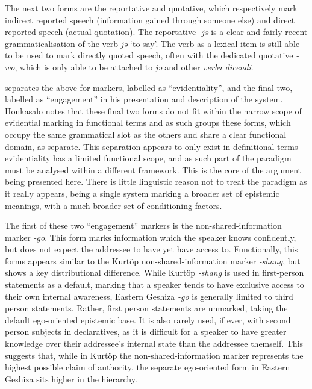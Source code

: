 The next two forms are the reportative and quotative, which respectively mark indirect reported speech (information gained through someone else) and direct reported speech (actual quotation). The reportative \textit{-jə} is a clear and fairly recent grammaticalisation of the verb \textit{jə} `to say'. The verb as a lexical item is still able to be used to mark directly quoted speech, often with the dedicated quotative \textit{-wo}, which is only able to be attached to \textit{jə} and other \textit{verba dicendi}.

 separates the above for markers, labelled as ``evidentiality'', and the final two, labelled as ``engagement'' in his presentation and description of the system. Honkasalo notes that these final two forms do not fit within the narrow scope of evidential marking in functional terms and as such groups these forms, which occupy the same grammatical slot as the others and share a clear functional domain, as separate. This separation appears to only exist in definitional terms - evidentiality has a limited functional scope, and as such part of the paradigm must be analysed within a different framework. This is the core of the argument being presented here. There is little linguistic reason not to treat the paradigm as it really appears, being a single system marking a broader set of epistemic meanings, with a much broader set of conditioning factors.

The first of these two ``engagement'' markers is the non-shared-information marker \textit{-go}. This form marks information which the speaker knows confidently, but does not expect the addressee to have yet have access to. Functionally, this forms appears similar to the Kurtöp non-shared-information marker \textit{-shang}, but shows a key distributional difference. While Kurtöp \textit{-shang} is used in first-person statements as a default, marking that a speaker tends to have exclusive access to their own internal awareness, Eastern Geshiza \textit{-go} is generally limited to third person statements. Rather, first person statements are unmarked, taking the default ego-oriented epistemic base. It is also rarely used, if ever, with second person subjects in declaratives, as it is difficult for a speaker to have greater knowledge over their addressee's internal state than the addressee themself. This suggests that, while in Kurtöp the non-shared-information marker represents the highest possible claim of authority, the separate ego-oriented form in Eastern Geshiza sits higher in the hierarchy.

